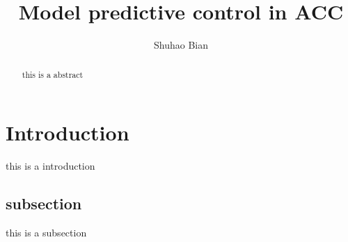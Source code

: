 \documentclass{article}
\title{Model predictive control in ACC}
\author{Shuhao Bian}
\numberwithin{equation}{section}
\begin{document}
\maketitle

\begin{abstract}
    this is a abstract
\end{abstract}

\section{Introduction}
this is a introduction~\cite{1337334}

\subsection{subsection}
this is a subsection



\end{document}
